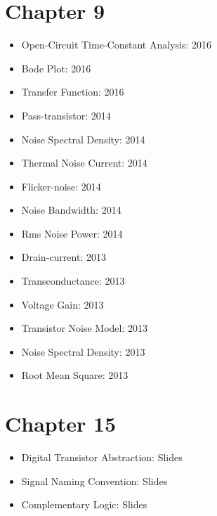 \documentclass[twocolumn]{article}
\begin{document}
  \section*{Chapter 9}
    \begin{itemize}
      \item Open-Circuit Time-Constant Analysis: 2016
      \item Bode Plot: 2016
      \item Transfer Function: 2016

      \item Pass-transistor: 2014
      \item Noise Spectral Density: 2014
      \item Thermal Noise Current: 2014
      \item Flicker-noise: 2014
      \item Noise Bandwidth: 2014
      \item Rms Noise Power: 2014

      \item Drain-current: 2013
      \item Transconductance: 2013
      \item Voltage Gain: 2013
      \item Transistor Noise Model: 2013
      \item Noise Spectral Density: 2013
      \item Root Mean Square: 2013
    \end{itemize}
  \section*{Chapter 15}
    \begin{itemize}
      \item Digital Transistor Abstraction: Slides
      \item Signal Naming Convention: Slides
      \item Complementary Logic: Slides
    \end{itemize}
\end{document}

